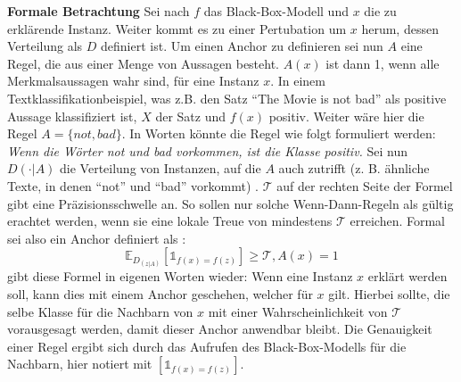 \textbf{Formale Betrachtung}
Sei nach \textcite{ribeiro2018anchors} $f$ das Black-Box-Modell und $x$ die zu erklärende Instanz. Weiter kommt es zu einer Pertubation um $x$ herum, dessen Verteilung als $D$ definiert ist. Um einen Anchor zu definieren sei nun $A$ eine Regel, die aus einer Menge von Aussagen besteht. $A(x)$ ist dann 1, wenn alle Merkmalsaussagen wahr sind, für eine Instanz $x$. In einem Textklassifikationbeispiel, was z.B. den Satz \enquote{The Movie is not bad} als positive Aussage klassifiziert ist, $X$ der Satz und $f(x)$ positiv. Weiter wäre hier die Regel $A=\{ not, bad \}$. In Worten könnte die Regel wie folgt formuliert werden: \emph{Wenn die Wörter not und bad vorkommen, ist die Klasse positiv.} 
Sei nun $D(\cdot{}|A)$ die Verteilung von Instanzen, auf die $A$ auch zutrifft (z. B. ähnliche Texte, in denen \enquote{not} und \enquote{bad} vorkommt) \cite{ribeiro2018anchors}. $\mathcal{T}$ auf der rechten Seite der Formel gibt eine Präzisionsschwelle an. So sollen nur solche Wenn-Dann-Regeln als gültig erachtet werden, wenn sie eine lokale Treue von mindestens $\mathcal{T}$ erreichen. Formal sei also ein Anchor definiert als \cite{ribeiro2018anchors}:
\begin{equation}
    \mathds{E}_{D_{(z|A)}}[\mathbb{1}_{f(x)=f(z)}]\geq \mathcal{T}, A(x)=1
\end{equation}
\textcite{molnar2022} gibt diese Formel in eigenen Worten wieder: Wenn eine Instanz $x$ erklärt werden soll, kann dies mit einem Anchor geschehen, welcher für $x$ gilt. Hierbei sollte, die selbe Klasse für die Nachbarn von $x$ mit einer Wahrscheinlichkeit von $\mathcal{T}$ vorausgesagt werden, damit dieser Anchor anwendbar bleibt. Die Genauigkeit einer Regel ergibt sich durch das Aufrufen des Black-Box-Modells für die Nachbarn, hier notiert mit $[\mathbb{1}_{f(x)=f(z)}]$.

